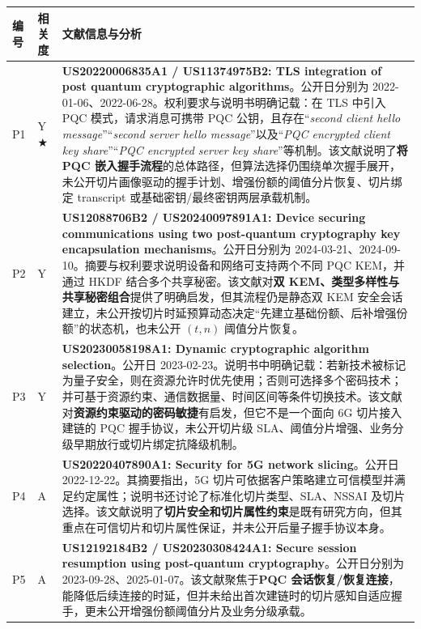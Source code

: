 \documentclass[12pt,a4paper]{article}
\begin{document}
\begingroup
{}
\small
\renewcommand{\arraystretch}{1.2}
\begin{longtable}{|p{1.2cm}|p{1.6cm}|p{11cm}|}
\hline
\textbf{编号} & \textbf{相关度} & \textbf{文献信息与分析} \\
\hline
P1 & Y$\bigstar$ & \textbf{US20220006835A1 / US11374975B2: TLS integration of post quantum cryptographic algorithms}。公开日分别为 2022-01-06、2022-06-28。权利要求与说明书明确记载：在 TLS 中引入 PQC 模式，请求消息可携带 PQC 公钥，且存在“\textit{second client hello message}”“\textit{second server hello message}”以及“\textit{PQC encrypted client key share}”“\textit{PQC encrypted server key share}”等机制。该文献说明了\textbf{将 PQC 嵌入握手流程}的总体路径，但算法选择仍围绕单次握手展开，未公开切片画像驱动的握手计划、增强份额的阈值分片恢复、切片绑定 transcript 或基础密钥/最终密钥两层承载机制。 \\
\hline
P2 & Y & \textbf{US12088706B2 / US20240097891A1: Device securing communications using two post-quantum cryptography key encapsulation mechanisms}。公开日分别为 2024-03-21、2024-09-10。摘要与权利要求说明设备和网络可支持两个不同 PQC KEM，并通过 HKDF 结合多个共享秘密。该文献对\textbf{双 KEM、类型多样性与共享秘密组合}提供了明确启发，但其流程仍是静态双 KEM 安全会话建立，未公开按切片时延预算动态决定“先建立基础份额、后补增强份额”的状态机，也未公开 $(t,n)$ 阈值分片恢复。 \\
\hline
P3 & Y & \textbf{US20230058198A1: Dynamic cryptographic algorithm selection}。公开日 2023-02-23。说明书中明确记载：若新技术被标记为量子安全，则在资源允许时优先使用；否则可选择多个密码技术；并可基于资源约束、通信数据量、时间区间等条件切换技术。该文献对\textbf{资源约束驱动的密码敏捷}有启发，但它不是一个面向 6G 切片接入建链的 PQC 握手协议，未公开切片级 SLA、阈值分片增强、业务分级早期放行或切片绑定抗降级机制。 \\
\hline
P4 & A & \textbf{US20220407890A1: Security for 5G network slicing}。公开日 2022-12-22。其摘要指出，5G 切片可依据客户策略建立可信模型并满足约定属性；说明书还讨论了标准化切片类型、SLA、NSSAI 及切片选择。该文献说明了\textbf{切片安全和切片属性约束}是既有研究方向，但其重点在可信切片和切片属性保证，并未公开后量子握手协议本身。 \\
\hline
P5 & A & \textbf{US12192184B2 / US20230308424A1: Secure session resumption using post-quantum cryptography}。公开日分别为 2023-09-28、2025-01-07。该文献聚焦于\textbf{PQC 会话恢复/恢复连接}，能降低后续连接的时延，但并未给出首次建链时的切片感知自适应握手，更未公开增强份额阈值分片及业务分级承载。 \\
\hline
\end{longtable}
\endgroup
\end{document}
